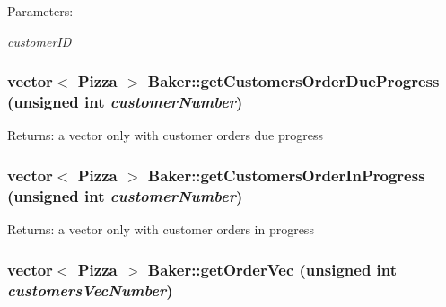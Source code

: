 \begin{Desc}
\item[Parameters:]
\begin{description}
\item[{\em customer\-ID}]\end{description}
\end{Desc}
\hypertarget{class_baker_7c9256e53372bd3a698e40cf64003c50}{
\subsubsection[getCustomersOrderDueProgress]{\setlength{\rightskip}{0pt plus 5cm}vector$<$ Pizza $>$ Baker::get\-Customers\-Order\-Due\-Progress (unsigned int {\em customer\-Number})}}
\label{class_baker_7c9256e53372bd3a698e40cf64003c50}


\begin{Desc}
\item[Returns:]a vector only with customer orders due progress \end{Desc}
\hypertarget{class_baker_96a7c1ec2dc23919a4e7ca8c399476e1}{
\subsubsection[getCustomersOrderInProgress]{\setlength{\rightskip}{0pt plus 5cm}vector$<$ Pizza $>$ Baker::get\-Customers\-Order\-In\-Progress (unsigned int {\em customer\-Number})}}
\label{class_baker_96a7c1ec2dc23919a4e7ca8c399476e1}


\begin{Desc}
\item[Returns:]a vector only with customer orders in progress \end{Desc}
\hypertarget{class_baker_ad0cbeddec394b25c5eade57247f4110}{
\subsubsection[getOrderVec]{\setlength{\rightskip}{0pt plus 5cm}vector$<$ Pizza $>$ Baker::get\-Order\-Vec (unsigned int {\em customers\-Vec\-Number})}}
\label{class_baker_ad0cbeddec394b25c5eade57247f4110}


